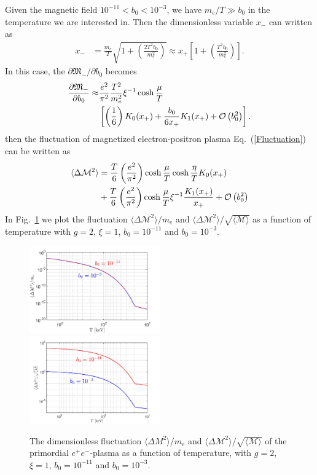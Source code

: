 \documentclass[aps,prd,floatfix,reprint]{revtex4-2}
\begin{document}
{ Given the magnetic field $10^{-11}<b_0<10^{-3}$, we have $m_e/T\gg b_0$ in the temperature we are interested in. Then the dimensionless variable $x_{-}$ can written as
 \begin{align}
 x_{-}&=\frac{m_e}{T}\sqrt{1+\left(\frac{2T^2b_0}{m^2_e}\right)}\approx x_{+}\left[1+\left(\frac{T^2b_0}{m^2_e}\right)\right].
 \end{align}
In this case, the $\partial{\mathfrak M}_{-}/\partial b_0$ becomes
\begin{align}
\frac{\partial {\mathfrak M}_{-} }{\partial b_0}\approx&\frac{e^{2}}{\pi^{2}}\frac{T^{2}}{m_{e}^{2}}\xi^{-1}\cosh{\frac{\mu}{T}}\notag\\
&\left[\left(\frac{1}{6}\right)K_0(x_{+})+\frac{b_0}{6x_{+}}K_1(x_{+})+{\cal O}\left(b_{0}^{2}\right)\right].
\end{align}
then the fluctuation of magnetized electron-positron plasma Eq.~(\ref{Fluctuation}) can be written as
 \begin{align}
  \langle\Delta \mathcal{M}^2\rangle
  &=\frac{T}{6}\left(\frac{e^{2}}{\pi^{2}}\right)\cosh{\frac{\mu}{T}}\cosh{\frac{\eta}{T}} K_0(x_+)\notag\\
  &+\frac{T}{6}\left(\frac{e^{2}}{\pi^{2}}\right)\cosh{\frac{\mu}{T}}\xi^{-1}\frac{K_1(x_+)}{x_+}+{\cal O}\left(b_{0}^{2}\right)
 \end{align} 
 In Fig.~\ref{Flu_fig} we plot the fluctuation $ \langle\Delta {\mathcal M}^2\rangle/m_e$ and  $\langle\Delta {\mathcal M}^2\rangle/\sqrt{\langle \mathcal M\rangle}$ as a function of temperature with $g=2$,  $\xi=1$, $b_0=10^{-11}$ and $b_0=10^{-3}$.
 \begin{figure}[ht]
 \centering
 \includegraphics[width=0.5\textwidth]{plots/Fluctuation_Magnetization}
 \includegraphics[width=0.5\textwidth]{plots/Fluctuation_M002}
 \caption{The  dimensionless fluctuation $ \langle\Delta {M}^2\rangle/m_e$  and  $\langle\Delta {\mathcal M}^2\rangle/\sqrt{\langle \mathcal M\rangle}$ of the primordial $e^{+}e^{-}$-plasma as a function of temperature, with $g=2$,  $\xi=1$, $b_0=10^{-11}$ and $b_0=10^{-3}$.} 
 \label{Flu_fig} 
\end{figure}
}
\end{document}
